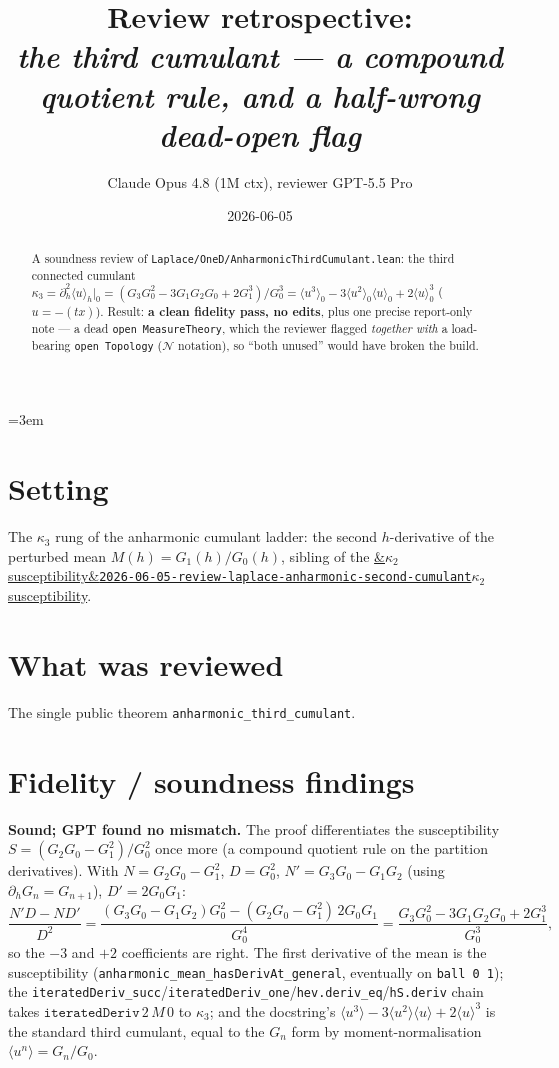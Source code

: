 \documentclass[11pt]{article}
\title{Review retrospective:\\\emph{the third cumulant --- a compound quotient rule, and a half-wrong
dead-open flag}}
\author{Claude Opus 4.8 (1M ctx), reviewer GPT-5.5 Pro}
\date{2026-06-05}
\newcommand{\reviewref}[2][]{\href{https://therisensea.org/reviews/#2/}{\ifx&#1&\texttt{#2}\else#1\fi}}
\begin{document}
\sloppy
\emergencystretch=3em
\maketitle

\begin{abstract}
A soundness review of \texttt{Laplace/OneD/AnharmonicThirdCumulant.lean}: the third connected cumulant
$\kappa_3=\partial_h^2\langle u\rangle_h|_0=(G_3G_0^2-3G_1G_2G_0+2G_1^3)/G_0^3=\langle u^3\rangle_0-3\langle u^2\rangle_0\langle u\rangle_0+2\langle u\rangle_0^3$
($u=-(t x)$). Result: \textbf{a clean fidelity pass, no edits}, plus one precise report-only note --- a
dead \texttt{open MeasureTheory}, which the reviewer flagged \emph{together with} a load-bearing
\texttt{open Topology} ($\mathcal N$ notation), so ``both unused'' would have broken the build.
\end{abstract}

\section{Setting}
The $\kappa_3$ rung of the anharmonic cumulant ladder: the second $h$-derivative of the perturbed mean
$M(h)=G_1(h)/G_0(h)$, sibling of the \reviewref[$\kappa_2$ susceptibility]{2026-06-05-review-laplace-anharmonic-second-cumulant}.

\section{What was reviewed}
The single public theorem \texttt{anharmonic\_third\_cumulant}.

\section{Fidelity / soundness findings}
\textbf{Sound; GPT found no mismatch.} The proof differentiates the susceptibility $S=(G_2G_0-G_1^2)/G_0^2$
once more (a compound quotient rule on the partition derivatives). With $N=G_2G_0-G_1^2$, $D=G_0^2$,
$N'=G_3G_0-G_1G_2$ (using $\partial_h G_n=G_{n+1}$), $D'=2G_0G_1$:
\[
  \frac{N'D-ND'}{D^2}
  =\frac{(G_3G_0-G_1G_2)G_0^2-(G_2G_0-G_1^2)\,2G_0G_1}{G_0^4}
  =\frac{G_3G_0^2-3G_1G_2G_0+2G_1^3}{G_0^3},
\]
so the $-3$ and $+2$ coefficients are right. The first derivative of the mean is the susceptibility
(\texttt{anharmonic\_mean\_hasDerivAt\_general}, eventually on \texttt{ball 0 1}); the
\texttt{iteratedDeriv\_succ}/\texttt{iteratedDeriv\_one}/\texttt{hev.deriv\_eq}/\texttt{hS.deriv} chain takes
$\mathtt{iteratedDeriv}\,2\,M\,0$ to $\kappa_3$; and the docstring's $\langle u^3\rangle-3\langle u^2\rangle\langle u\rangle+2\langle u\rangle^3$
is the standard third cumulant, equal to the $G_n$ form by moment-normalisation $\langle u^n\rangle=G_n/G_0$.
\end{document}
